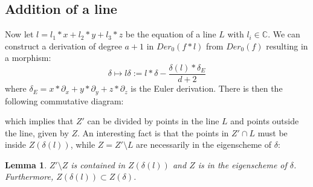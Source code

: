 \documentclass{article}
\newtheorem{lemma}[theorem]{Lemma}
\begin{document}
\subsection{Addition of a line}
Now let $l = l_1*x+l_2*y+l_3*z$ be the equation of a line $L$ with $l_i \in \mathbb{C}$. We can construct a derivation of degree $a+1$ in $Der_0(f*l)$ from $Der_0(f)$ resulting in a morphism:
\begin{equation}
    \delta \mapsto l\delta := l*\delta - \frac{\delta(l)*\delta_E}{d+2}
\end{equation}
where $\delta_E = x*\partial_x + y*\partial_y + z*\partial_z$ is the Euler derivation. There is then the following commutative diagram:
\begin{center}
\end{center}
which implies that $Z'$ can be divided by points in the line $L$ and points outside the line, given by $Z$. An interesting fact is that the points in $Z' \cap L$ must be inside $Z(\delta(l))$, while $Z = Z' \setminus L$ are necessarily in the eigenscheme of $\delta$:
\begin{lemma}
    $Z' \setminus Z$ is contained in $Z(\delta(l))$ and $Z$ is in the eigenscheme of $\delta$. Furthermore, $Z(\delta(l)) \subset Z(\delta)$.
\end{lemma}
\end{document}
